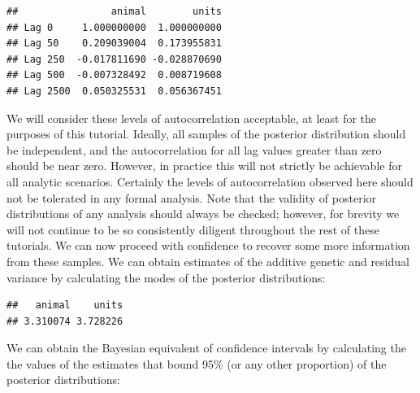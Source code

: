 \documentclass[
  12pt,
]{book}
\newenvironment{Shaded}{\begin{snugshade}}{\end{snugshade}}
\newcommand{\FloatTok}[1]{\textcolor[rgb]{0.00,0.00,0.81}{#1}}
\newcommand{\KeywordTok}[1]{\textcolor[rgb]{0.13,0.29,0.53}{\textbf{#1}}}
\newcommand{\NormalTok}[1]{#1}
\newcommand{\OperatorTok}[1]{\textcolor[rgb]{0.81,0.36,0.00}{\textbf{#1}}}
\begin{document}
\begin{Shaded}
\end{Shaded}

\begin{verbatim}
##                animal        units
## Lag 0     1.000000000  1.000000000
## Lag 50    0.209039004  0.173955831
## Lag 250  -0.017811690 -0.028870690
## Lag 500  -0.007328492  0.008719608
## Lag 2500  0.050325531  0.056367451
\end{verbatim}

We will consider these levels of autocorrelation acceptable, at least for the purposes of this tutorial. Ideally, all samples of the posterior distribution should be independent, and the autocorrelation for all lag values greater than zero should be near zero. However, in practice this will not strictly be achievable for all analytic scenarios. Certainly the levels of autocorrelation observed here should not be tolerated in any formal analysis.
Note that the validity of posterior distributions of any analysis should always be checked; however, for brevity we will not continue to be so consistently diligent throughout the rest of these tutorials. We can now proceed with confidence to recover some more information from these samples. We can obtain estimates of the additive genetic and residual variance by calculating the modes of the posterior distributions:

\begin{Shaded}
\end{Shaded}

\begin{verbatim}
##   animal    units 
## 3.310074 3.728226
\end{verbatim}

We can obtain the Bayesian equivalent of confidence intervals by calculating the the values of the estimates that bound 95\% (or any other proportion) of the posterior distributions:

\begin{Shaded}
\end{Shaded}
\end{document}
